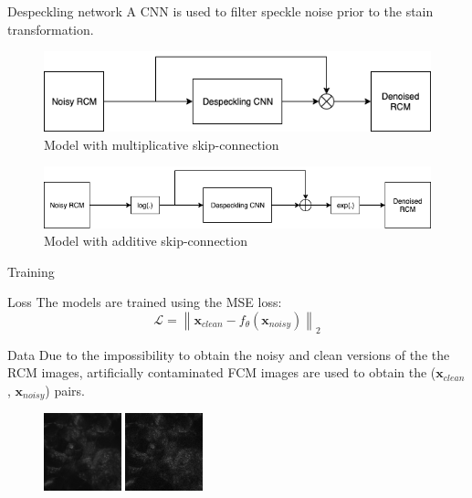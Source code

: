 \documentclass[t]{beamer}
\newcommand{\tensor}[1]{\mathbf{#1}}
\begin{document}
\begin{frame}{Despeckling network}
A CNN is used to filter speckle noise prior to the stain transformation.\pause

\begin{figure}
\centering
\includegraphics[scale=0.3]{despeckling-nn_multiplicative}
\caption{Model with multiplicative skip-connection}
\end{figure}\pause

\begin{figure}
\centering
\includegraphics[scale=0.3]{despeckling-nn_additive}
\caption{Model with additive skip-connection}
\end{figure}

\end{frame}

\begin{frame}{Training}

\begin{block}{Loss}
The models are trained using the MSE loss:
\[ \mathcal{L} = \left\| \tensor{x}_{clean} - f_{\theta}(\tensor{x}_{noisy}) \right\|_2 \]
\end{block}\pause

\begin{block}{Data}
Due to the impossibility to obtain the noisy and clean versions of the the RCM images,
artificially contaminated FCM images are used to obtain the ($\tensor{x}_{clean}$, $\tensor{x}_{noisy}$) pairs.
\end{block}
\begin{figure}
\centering
\includegraphics[width=0.2\textwidth]{9_768-6912_F-thumbnail}\hspace{0.15\textwidth}%
\includegraphics[width=0.2\textwidth]{9_768-6912_F-thumbnail_noisy}
\end{figure}

\end{frame}
\end{document}
